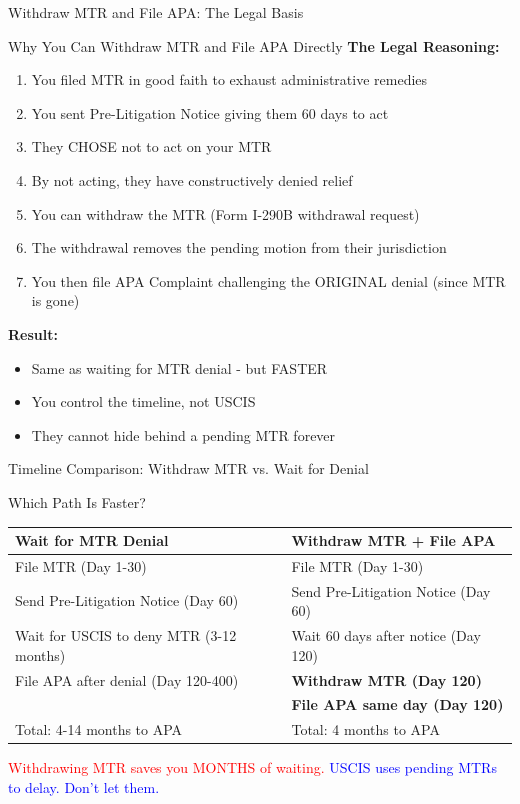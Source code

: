 \documentclass[11pt]{beamer}
\begin{document}
	\begin{frame}{Withdraw MTR and File APA: The Legal Basis}
		\scriptsize
		\begin{block}{Why You Can Withdraw MTR and File APA Directly}
			\textbf{The Legal Reasoning:}
			\vspace{0.2cm}
			\begin{enumerate}
				\item You filed MTR in good faith to exhaust administrative remedies
				\item You sent Pre-Litigation Notice giving them 60 days to act
				\item They CHOSE not to act on your MTR
				\item By not acting, they have constructively denied relief
				\item You can withdraw the MTR (Form I-290B withdrawal request)
				\item The withdrawal removes the pending motion from their jurisdiction
				\item You then file APA Complaint challenging the ORIGINAL denial (since MTR is gone)
			\end{enumerate}
			\textbf{Result:}
			\begin{itemize}
				\item Same as waiting for MTR denial - but FASTER
				\item You control the timeline, not USCIS
				\item They cannot hide behind a pending MTR forever
			\end{itemize}
		\end{block}
	\end{frame}
	
	\begin{frame}{Timeline Comparison: Withdraw MTR vs. Wait for Denial}
		\scriptsize
		\begin{block}{Which Path Is Faster?}
			\centering
			\begin{tabular}{|p{5cm}|p{4cm}|}
				\hline
				\textbf{Wait for MTR Denial} & \textbf{Withdraw MTR + File APA} \\
				\hline
				File MTR (Day 1-30) & File MTR (Day 1-30) \\
				\hline
				Send Pre-Litigation Notice (Day 60) & Send Pre-Litigation Notice (Day 60) \\
				\hline
				Wait for USCIS to deny MTR (3-12 months) & Wait 60 days after notice (Day 120) \\
				\hline
				File APA after denial (Day 120-400) & \textbf{Withdraw MTR (Day 120)} \\
				\hline
				& \textbf{File APA same day (Day 120)} \\
				\hline
				Total: 4-14 months to APA & Total: 4 months to APA \\
				\hline
			\end{tabular}
			\vspace{0.2cm}
			\textcolor{red}{Withdrawing MTR saves you MONTHS of waiting.}
			\textcolor{blue}{USCIS uses pending MTRs to delay. Don't let them.}
		\end{block}
	\end{frame}
	
\end{document}
